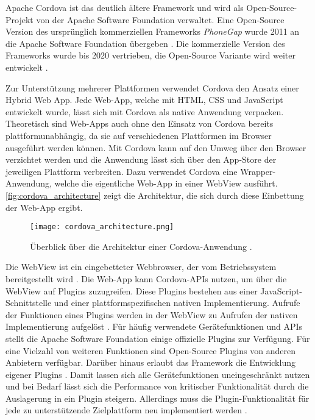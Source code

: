 Apache Cordova ist das deutlich ältere Framework und wird als Open-Source-Projekt von der Apache Software Foundation verwaltet.
Eine Open-Source Version des ursprünglich kommerziellen Frameworks \textit{PhoneGap} wurde 2011 an die Apache Software Foundation übergeben \cite{Steyer_Cordova}.
Die kommerzielle Version des Frameworks wurde bis 2020 vertrieben, die Open-Source Variante wird weiter entwickelt \cite{Adobe_PhoneGap_EOL}.


Zur Unterstützung mehrerer Plattformen verwendet Cordova den Ansatz einer Hybrid Web App.
Jede Web-App, welche mit \ac{HTML}, \ac{CSS} und JavaScript entwickelt wurde, lässt sich mit Cordova als native Anwendung verpacken.
Theoretisch sind Web-Apps auch ohne den Einsatz von Cordova bereits plattformunabhängig, da sie auf verschiedenen Plattformen im Browser ausgeführt werden können.
Mit Cordova kann auf den Umweg über den Browser verzichtet werden und die Anwendung lässt sich über den App-Store der jeweiligen Plattform verbreiten.
Dazu verwendet Cordova eine Wrapper-Anwendung, welche die eigentliche Web-App in einer WebView ausführt.
\autoref{fig:cordova_architecture} zeigt die Architektur, die sich durch diese Einbettung der Web-App ergibt.
\begin{figure}[h]
    \centering
    \texttt{[image: cordova\_architecture.png]}
    \caption{Überblick über die Architektur einer Cordova-Anwendung \cite{Cordova_Overview}.}
    \label{fig:cordova_architecture}
\end{figure}
Die WebView ist ein eingebetteter Webbrowser, der vom Betriebssystem bereitgestellt wird \cite{Steyer_Cordova}.
Die Web-App kann Cordova-\acp{API} nutzen, um über die WebView auf Plugins zuzugreifen.
Diese Plugins bestehen aus einer JavaScript-Schnittstelle und einer plattformspezifischen nativen Implementierung.
Aufrufe der Funktionen eines Plugins werden in der WebView zu Aufrufen der nativen Implementierung aufgelöst \cite{Steyer_Cordova,Heitkoetter_CrossPlatform_Comparison}.
Für häufig verwendete Gerätefunktionen und \acp{API} stellt die Apache Software Foundation einige offizielle Plugins zur Verfügung.
Für eine Vielzahl von weiteren Funktionen sind Open-Source Plugins von anderen Anbietern verfügbar. 
Darüber hinaus erlaubt das Framework die Entwicklung eigener Plugins \cite{Cordova_Overview}.
Damit lassen sich alle Gerätefunktionen uneingeschränkt nutzen und bei Bedarf lässt sich die Performance von kritischer Funktionalität durch die Auslagerung in ein Plugin steigern.
Allerdings muss die Plugin-Funktionalität für jede zu unterstützende Zielplattform neu implementiert werden \cite{Steyer_Cordova}.

